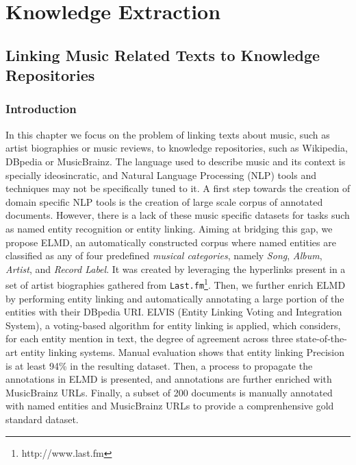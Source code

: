\part{Knowledge Extraction}
\label{part:knowledge-extraction}

\chapter{Linking Music Related Texts to Knowledge Repositories}
\label{sec:linking}


\section{Introduction}
\label{sec:linking:intro}

In this chapter we focus on the problem of linking texts about music, such as artist biographies or music reviews, to knowledge repositories, such as Wikipedia, DBpedia or MusicBrainz. 
The language used to describe music and its context is specially ideosincratic, and Natural Language Processing (NLP) tools and techniques may not be specifically tuned to it. A first step towards the creation of domain specific NLP tools is the creation of large scale corpus of annotated documents.
However, there is a lack of these music specific datasets for tasks such as named entity recognition or entity linking. Aiming at bridging this gap, we propose \textsc{ELMD}, an automatically constructed corpus where named entities are classified as any of four predefined \textit{musical categories}, namely \textit{Song}, \textit{Album}, \textit{Artist}, and \textit{Record Label}. It was created by leveraging the hyperlinks present in a set of artist biographies gathered from \texttt{Last.fm}\footnote{http://www.last.fm}. Then, we further enrich \textsc{ELMD} by performing entity linking and automatically annotating a large portion of the entities with their DBpedia URI. \textsc{ELVIS} (Entity Linking Voting and Integration System), a voting-based algorithm for entity linking is applied, which considers, for each entity mention in text, the degree of agreement across three state-of-the-art entity linking systems. 
Manual evaluation shows that entity linking Precision is at least 94\% in the resulting dataset.
Then, a process to propagate the annotations in \textsc{ELMD} is presented, and annotations are further enriched with MusicBrainz URLs.
Finally, a subset of 200 documents is manually annotated with named entities and MusicBrainz URLs to provide a comprenhensive gold standard dataset. 

